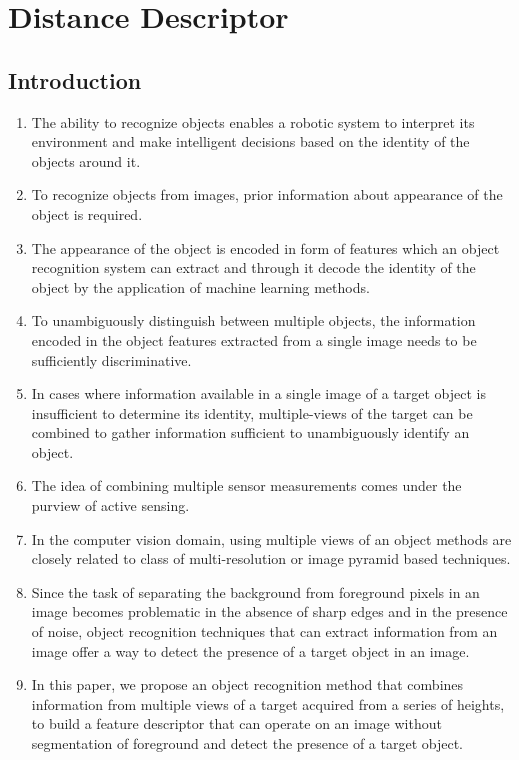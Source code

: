 \documentclass {udthesis}
\begin{document}

\chapter{Distance Descriptor}
\label{chap:dist_des}

\section{Introduction}
\begin{enumerate}
	\item The ability to recognize objects enables a robotic system to interpret its environment and make intelligent decisions based on the identity of the objects around it.
	
	\item To recognize objects from images, prior information about appearance of the object is required.
	
	\item The appearance of the object is encoded in form of features which an object recognition system can extract and through it decode the identity of the object by the application of machine learning methods.

	\item To unambiguously distinguish between multiple objects, the information encoded in the object features extracted from a single image needs to be sufficiently discriminative.
	
	\item In cases where information available in a single image of a target object is insufficient to determine its identity, multiple-views of the target can be combined to gather information sufficient to unambiguously identify an object.
	
	\item The idea of combining multiple sensor measurements comes under the purview of active sensing.

	\item In the computer vision domain, using multiple views of an object methods are closely related to class of multi-resolution or image pyramid based techniques.

	\item Since the task of separating the background from foreground pixels in an image becomes problematic in the absence of sharp edges and in the presence of noise, object recognition techniques that can extract information from an image offer a way to detect the presence of a target object in an image.
		
	\item In this paper, we propose an object recognition method that combines information from multiple views of a target acquired from a series of heights, to build a feature descriptor that can operate on an image without segmentation of foreground and detect the presence of a target object.	
\end{enumerate}
\end{document}

